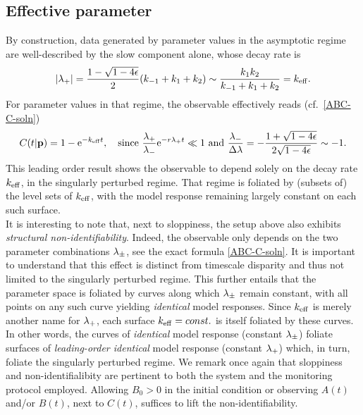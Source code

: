 \subsection{Effective parameter}
%
By construction, data generated by parameter values in the asymptotic regime
are well-described by the slow component alone, whose decay rate is
%
\[
 \vert \lambda_+ \vert
=
 \frac{1 - \sqrt{1-4\epsilon}}{2}
 (k_{-1}+k_1+k_2)
\sim
 \frac{k_1 k_2}{k_{-1}+k_1+k_2}
=
 k_\mathrm{eff} .
\]
%
For parameter values in that regime, the observable effectively reads (cf.~\eqref{ABC-C-soln})
%
\[
 C(t \vert \mathbf{p})
=
 1
-
 \mathrm{e}^{-k_\mathrm{eff} t} ,
\quad\mbox{since}\
 \frac{\lambda_+}{\lambda_-}
 \mathrm{e}^{-r \lambda_+ t}
\ll
 1
\ \mbox{and} \
 \frac{\lambda_-}{\Delta\lambda}
=
-
\frac{
 1 + \sqrt{1 - 4 \epsilon}
}{
 2 \sqrt{1 - 4 \epsilon}
}
\sim
 -1 .
\]
%
This leading order result shows the observable to depend solely on the
decay rate $k_\mathrm{eff}$, in the singularly perturbed regime.  That regime
is foliated by (subsets of) the level sets of $k_\mathrm{eff}$,
with the model response remaining largely constant on each such surface.\\

It is interesting to note that, next to sloppiness, the setup above
also exhibits \emph{structural non-identifiability}.  Indeed, the
observable only depends on the two parameter combinations $\lambda_\pm$, see
the exact formula \eqref{ABC-C-soln}.  It is important to understand
that this effect is distinct from timescale disparity and thus not
limited to the singularly perturbed regime.  This further entails that
the parameter space is foliated by curves along which $\lambda_\pm$ remain
constant, with all points on any such curve yielding \emph{identical}
model responses.  Since $k_\mathrm{eff}$ is merely another name for $\lambda_+$, each
surface $k_\mathrm{eff} = const.$ is itself foliated by these curves.  In other
words, the curves of \emph{identical} model response (constant $\lambda_\pm$)
foliate surfaces of \emph{leading-order identical} model response
(constant $\lambda_+$) which, in turn, foliate the singularly perturbed
regime.  We remark once again that sloppiness and non-identifialibity
are pertinent to both the system and the monitoring protocol employed.
Allowing $B_0>0$ in the initial condition or observing $A(t)$ and/or
$B(t)$, next to $C(t)$, suffices to lift the non-identifiability.\\


